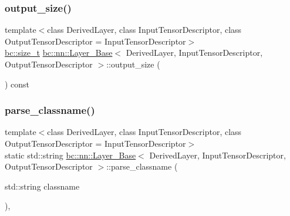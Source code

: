 \mbox{\label{structbc_1_1nn_1_1Layer__Base_a1f5d7b9b3096649c0f2149c5917aec16}} 
\subsubsection{\texorpdfstring{output\+\_\+size()}{output\_size()}}
{\footnotesize\ttfamily template$<$class Derived\+Layer, class Input\+Tensor\+Descriptor, class Output\+Tensor\+Descriptor = Input\+Tensor\+Descriptor$>$ \\
\hyperlink{namespacebc_aaf8e3fbf99b04b1b57c4f80c6f55d3c5}{bc\+::size\+\_\+t} \hyperlink{structbc_1_1nn_1_1Layer__Base}{bc\+::nn\+::\+Layer\+\_\+\+Base}$<$ Derived\+Layer, Input\+Tensor\+Descriptor, Output\+Tensor\+Descriptor $>$\+::output\+\_\+size (\begin{DoxyParamCaption}{ }\end{DoxyParamCaption}) const\hspace{0.3cm}{\ttfamily [inline]}}

\mbox{\label{structbc_1_1nn_1_1Layer__Base_a1a046bb75106966abd0e0d02bfec7e16}} 
\subsubsection{\texorpdfstring{parse\+\_\+classname()}{parse\_classname()}}
{\footnotesize\ttfamily template$<$class Derived\+Layer, class Input\+Tensor\+Descriptor, class Output\+Tensor\+Descriptor = Input\+Tensor\+Descriptor$>$ \\
static std\+::string \hyperlink{structbc_1_1nn_1_1Layer__Base}{bc\+::nn\+::\+Layer\+\_\+\+Base}$<$ Derived\+Layer, Input\+Tensor\+Descriptor, Output\+Tensor\+Descriptor $>$\+::parse\+\_\+classname (\begin{DoxyParamCaption}\item[{std\+::string}]{classname }\end{DoxyParamCaption})\hspace{0.3cm}{\ttfamily [inline]}, {\ttfamily [static]}}

